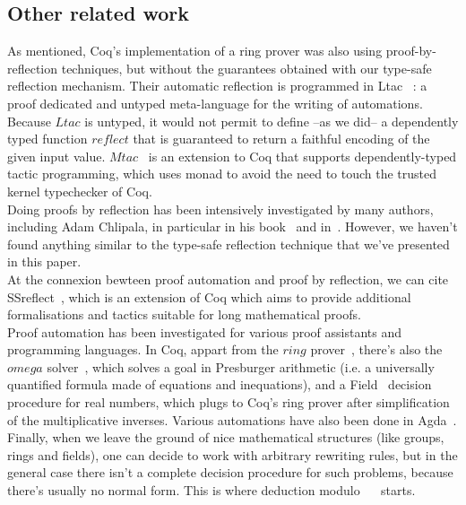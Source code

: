	\subsection{Other related work}
	
As mentioned, Coq's implementation of a ring prover was also using proof-by-reflection techniques, but without the guarantees obtained with our type-safe reflection mechanism. Their automatic reflection is programmed in Ltac~\cite{DelahayeLTac} : a proof dedicated and untyped meta-language for the writing of automations. Because $Ltac$ is untyped, it would not permit to define --as we did-- a dependently typed function $reflect$ that is guaranteed to return a faithful encoding of the given input value. $Mtac$~\cite{Ziliani13} is an extension to Coq that supports dependently-typed tactic programming, which uses monad to avoid the need to touch the trusted kernel typechecker of Coq.
\\

Doing proofs by reflection has been intensively investigated by many authors, including Adam Chlipala, in particular in his book~\cite{ChlipalaBook} and in~\cite{Malecha14}. However, we haven't found anything similar to the type-safe reflection technique that we've presented in this paper. 
\\

At the connexion bewteen proof automation and proof by reflection, we can cite SSreflect~\cite{GonthierTuto}, which is an extension of Coq which aims to provide additional formalisations and tactics suitable for long mathematical proofs.
\\

Proof automation has been investigated for various proof assistants and programming languages. In Coq, appart from the $ring$ prover~\cite{Coq2005}, there's also the $omega$ solver~\cite{Cregut04}, which solves a goal in Presburger arithmetic (i.e. a universally quantified formula made of equations and inequations), and a Field~\cite{DelahayeField} decision procedure for real numbers, which plugs to Coq's ring prover after simplification of the multiplicative inverses. Various automations have also been done in Agda~\cite{Lindblad04}.
\\

Finally, when we leave the ground of nice mathematical structures (like groups, rings and fields), one can decide to work with arbitrary rewriting rules, but in the general case there isn't a complete decision procedure for such problems, because there's usually no normal form. This is where deduction modulo~\cite{Dowek03} ~\cite{DelahayeModulo} starts.


